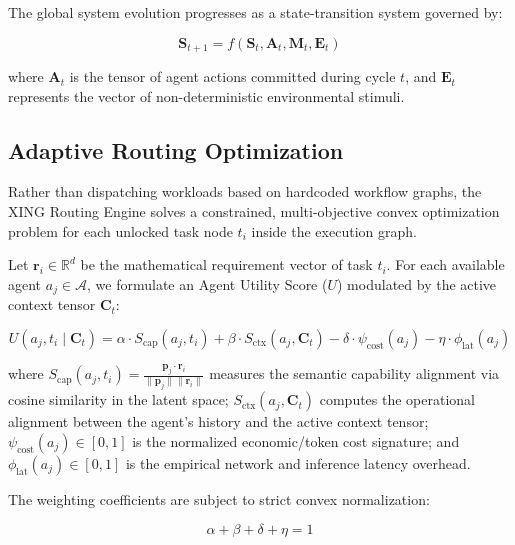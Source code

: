 \documentclass[conference]{IEEEtran}
\newcommand{\R}{\mathbb{R}}
\begin{document}
The global system evolution progresses as a state-transition system governed by:

\begin{equation}
    \mathbf{S}_{t+1} = f(\mathbf{S}_t, \mathbf{A}_t, \mathbf{M}_t, \mathbf{E}_t)
    \label{eq:state_transition}
\end{equation}

where $\mathbf{A}_t$ is the tensor of agent actions committed during cycle $t$, and $\mathbf{E}_t$ represents the vector of non-deterministic environmental stimuli.

\subsection{Adaptive Routing Optimization}
\label{sec:routing}

Rather than dispatching workloads based on hardcoded workflow graphs, the XING Routing Engine solves a constrained, multi-objective convex optimization problem for each unlocked task node $t_i$ inside the execution graph.

Let $\mathbf{r}_i \in \R^d$ be the mathematical requirement vector of task $t_i$. For each available agent $a_j \in \mathcal{A}$, we formulate an Agent Utility Score ($U$) modulated by the active context tensor $\mathbf{C}_t$:

\begin{equation}
    U(a_j, t_i \mid \mathbf{C}_t) = \alpha \cdot S_{\mathrm{cap}}(a_j, t_i) + \beta \cdot S_{\mathrm{ctx}}(a_j, \mathbf{C}_t)
    - \delta \cdot \psi_{\mathrm{cost}}(a_j) - \eta \cdot \phi_{\mathrm{lat}}(a_j)
    \label{eq:utility}
\end{equation}

where $S_{\mathrm{cap}}(a_j, t_i) = \frac{\mathbf{p}_j \cdot \mathbf{r}_i}{\|\mathbf{p}_j\| \|\mathbf{r}_i\|}$ measures the semantic capability alignment via cosine similarity in the latent space; $S_{\mathrm{ctx}}(a_j, \mathbf{C}_t)$ computes the operational alignment between the agent's history and the active context tensor; $\psi_{\mathrm{cost}}(a_j) \in [0,1]$ is the normalized economic/token cost signature; and $\phi_{\mathrm{lat}}(a_j) \in [0,1]$ is the empirical network and inference latency overhead.

The weighting coefficients are subject to strict convex normalization:

\begin{equation}
    \alpha + \beta + \delta + \eta = 1
    \label{eq:weight_normalization}
\end{equation}
\end{document}
